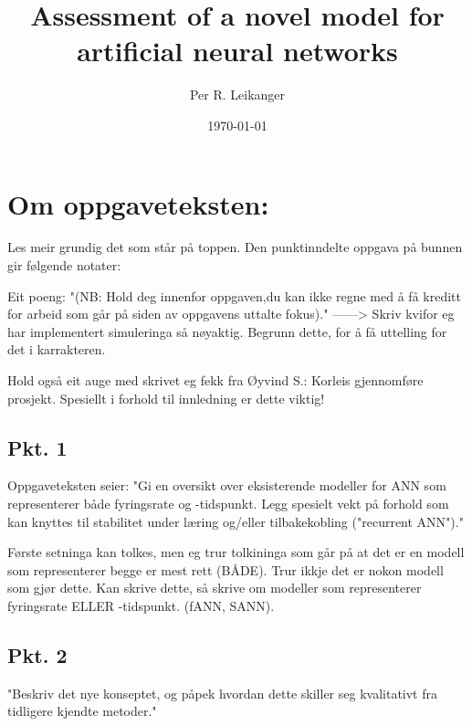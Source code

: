 \documentclass[a4paper,11 pt]{report}
\author{Per R. Leikanger}
\title{Assessment of a novel model for artificial neural networks}
\date{\today}
\begin{document}
   

\maketitle




\chapter{Om oppgaveteksten:}
Les meir grundig det som står på toppen. Den punktinndelte oppgava på bunnen gir følgende notater:

Eit poeng: "(NB: Hold deg innenfor oppgaven,du kan ikke regne med å få
kreditt for arbeid som går på siden av oppgavens uttalte fokus)."
------> Skriv kvifor eg har implementert simuleringa så nøyaktig. Begrunn dette, for å få uttelling for det i karrakteren. 

Hold også eit auge med skrivet eg fekk fra Øyvind S.: Korleis gjennomføre prosjekt. Spesiellt i forhold til innledning er dette viktig!
	\section{Pkt. 1}
Oppgaveteksten seier: "Gi en oversikt over eksisterende modeller for ANN som representerer både fyringsrate og -tidspunkt. 
Legg spesielt vekt på forhold som kan knyttes til stabilitet under læring og/eller tilbakekobling ("recurrent ANN")."

Første setninga kan tolkes, men eg trur tolkininga som går på at det er en modell som representerer begge er mest rett (BÅDE). 
Trur ikkje det er nokon modell som gjør dette. Kan skrive dette, så skrive om modeller som representerer fyringsrate ELLER -tidspunkt. (fANN, SANN).


	\section{Pkt. 2}
"Beskriv det nye konseptet, og påpek hvordan dette skiller seg kvalitativt fra tidligere kjendte metoder."
\end{document}
